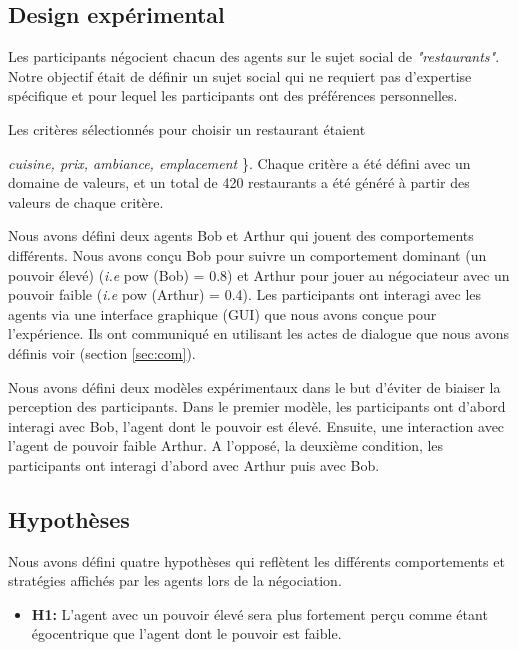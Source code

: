 			\subsection{Design expérimental}
			
			Les participants négocient chacun des agents sur le sujet social de \emph {"restaurants"}. Notre objectif était de définir un sujet social qui ne requiert pas d'expertise spécifique et pour lequel les participants ont des préférences personnelles.
			
			Les critères sélectionnés pour choisir un restaurant étaient \ {\textit {cuisine, prix, ambiance, emplacement} \}. Chaque critère a été défini avec un domaine de valeurs, et un total de 420 restaurants a été généré à partir des valeurs de chaque critère.
				
			Nous avons défini deux agents Bob et Arthur qui jouent des comportements différents. Nous avons conçu Bob pour suivre un comportement dominant (un pouvoir élevé) (\textit {i.e} pow (Bob) = 0.8) et Arthur pour jouer au négociateur avec un pouvoir faible (\textit {i.e} pow (Arthur) = 0.4).
			Les participants ont interagi avec les agents via une interface graphique (GUI) que nous avons conçue pour l'expérience. Ils ont communiqué en utilisant les actes de dialogue que nous avons définis voir (section \ref {sec:com}).
						
			Nous avons défini deux modèles expérimentaux dans le but d'éviter de biaiser la perception des participants. Dans le premier modèle, les participants ont d'abord interagi avec Bob, l'agent dont le pouvoir est élevé. Ensuite, une interaction avec l'agent de pouvoir faible Arthur.
			A l'opposé, la deuxième condition, les participants ont interagi d'abord avec Arthur puis avec Bob.
			
			\subsection {Hypothèses}
			Nous avons défini quatre hypothèses qui reflètent les différents comportements et stratégies affichés par les agents lors de la négociation.
			
			\begin{itemize}
				\item \textbf {H1:} L'agent avec un pouvoir élevé sera plus fortement perçu comme étant égocentrique que l'agent dont le pouvoir est faible.
				

\end{itemize}}
